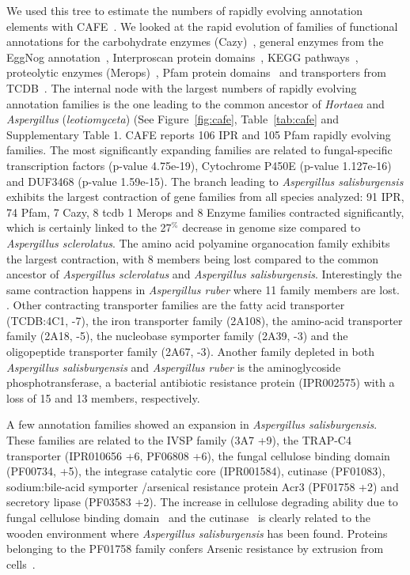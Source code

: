 \documentclass[jof,article,submit,moreauthors,pdftex,10pt,a4paper]{Definitions/mdpi}
\newcommand{\TODO}[1]{\textbf{\color{red}{#1}}}
\newcommand{\aspRub}{\textit{Aspergillus ruber}}
\newcommand{\phiSp}{\textit{Aspergillus salisburgensis}}
\newcommand{\phiScl}{\textit{Aspergillus sclerolatus}}
\begin{document}
We used this tree to estimate the numbers of rapidly evolving annotation elements with CAFE~\cite{DeBie2006}.
We looked at the rapid evolution of families of functional annotations for the carbohydrate enzymes (Cazy)~\cite{Cantarel2009}, general enzymes from the EggNog annotation~\cite{HuertaCepas2016}, Interproscan protein domains~\cite{Jones2014a}, KEGG pathways~\cite{Ogata1999}, proteolytic enzymes (Merops)~\cite{Rawlings2014}, Pfam protein domains~\cite{Finn2014a} and transporters from TCDB~\cite{Saier2006}. The internal node with the largest numbers of rapidly evolving annotation families is the one leading to the common ancestor of \textit{Hortaea} and \textit{Aspergillus} (\textit{leotiomyceta}) (See Figure~\ref{fig:cafe}, Table~\ref{tab:cafe} and Supplementary Table 1. CAFE reports 106 IPR and 105 Pfam rapidly evolving families. The most significantly expanding families are related to fungal-specific transcription factors (p-value 4.75e-19), Cytochrome P450E (p-value 1.127e-16) and DUF3468 (p-value 1.59e-15). The branch leading to \phiSp{} exhibits the largest contraction of gene families from all species analyzed: 91 IPR, 74 Pfam, 7 Cazy, 8 tcdb 1 Merops and 8 Enzyme families contracted significantly, which is certainly linked to the 27$^\%$ decrease in genome size compared to \phiScl{}. The amino acid polyamine organocation family exhibits the largest contraction, with 8 members being lost compared to the common ancestor of \phiScl{} and \phiSp{}. Interestingly the same contraction happens in \aspRub{} where 11 family members are lost. \TODO{Discuss APC impact on halotolerance. APC downregulated in P. indica https://link.springer.com/article/10.1007$\%$2Fs11274-015-1867-5}. Other contracting transporter families are the fatty acid transporter (TCDB:4C1, -7), the iron transporter family (2A108), the amino-acid transporter family (2A18, -5), the nucleobase symporter family (2A39, -3) and the oligopeptide transporter family (2A67, -3). Another family depleted in both \phiSp{} and \aspRub{} is the  aminoglycoside phosphotransferase, a bacterial antibiotic resistance protein (IPR002575) with a loss of 15 and 13 members, respectively. 

A few annotation families showed an expansion in \phiSp{}. These families are related to the IVSP family (3A7 +9), the TRAP-C4 transporter (IPR010656 +6, PF06808 +6), the fungal cellulose binding domain (PF00734, +5), the integrase catalytic core (IPR001584), cutinase (PF01083), sodium:bile-acid symporter /arsenical resistance protein Acr3 (PF01758 +2) and secretory lipase (PF03583 +2). The increase in cellulose degrading ability due to fungal cellulose binding domain~\cite{Gilkes1991} and the cutinase~\cite{Sweigard1992} is clearly related to the wooden environment where \phiSp{} has been found. Proteins belonging to the PF01758 family confers Arsenic resistance by extrusion from cells~\cite{Fu2009}.        
\end{document}
